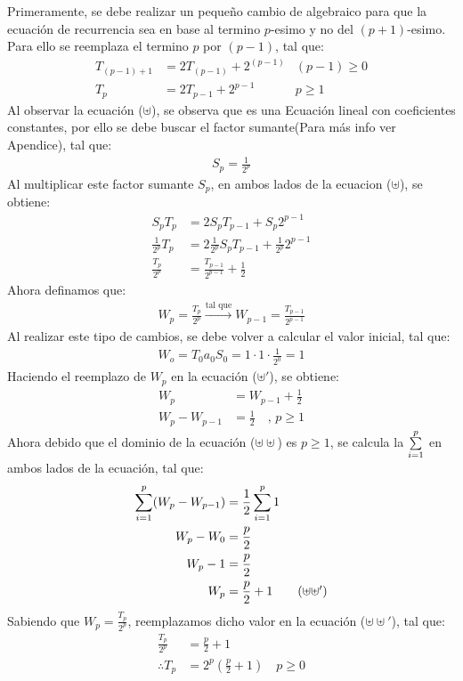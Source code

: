 Primeramente, se debe realizar un pequeño cambio de algebraico para que la ecuación de recurrencia sea en base al termino $p$-esimo y no del $(p+1)$-esimo.
Para ello se reemplaza el termino $p$ por $(p-1)$, tal que:
\begin{align*}
     T_{(p-1)+1} &= 2T_{(p-1)} +2^{(p-1)} & (p-1)\ge0 \\
     T_{p} &= 2T_{p-1} +2^{p-1} & p\ge1 \tag{$\uplus$}
\end{align*}
Al observar la ecuación ($\uplus$), se observa que es una Ecuación lineal con coeficientes constantes, por ello se debe buscar el factor sumante(Para más info ver Apendice), tal que:
\begin{align*}
    S_p = \frac{1}{2^p}
\end{align*}
Al multiplicar este factor sumante $S_p$, en ambos lados de la ecuacion ($\uplus$), se obtiene:
\begin{align*}
    S_p T_{p} &= 2S_pT_{p-1} +S_p2^{p-1} \\
    \frac{1}{2^p} T_{p} &= 2\frac{1}{2^p}S_pT_{p-1} +\frac{1}{2^p}2^{p-1} \\
    \frac{T_p}{2^p} &= \frac{T_{p-1}}{2^{p-1}} + \frac{1}{2} \tag{$\uplus'$}
\end{align*}
Ahora definamos que:
\begin{align*}
    W_p = \frac{T_p}{2^p} \xrightarrow{\text{tal que}} W_{p-1} = \frac{T_{p-1}}{2^{p-1}}
\end{align*}
Al realizar este tipo de cambios, se debe volver a calcular el valor inicial, tal que:
\begin{align*}
    W_o = T_0 a_0 S_0 = 1 \cdot 1 \cdot \frac{1}{2^0} = 1 
\end{align*}
Haciendo el reemplazo de $W_p$ en la ecuación ($\uplus '$), se obtiene:
\begin{align*}
    W_p &= W_{p-1} + \frac{1}{2} \\ 
    W_p - W_{p-1} &= \frac{1}{2} \quad \text{, } p \ge 1 \tag{$\uplus \uplus $}
\end{align*}
Ahora debido que el dominio de la ecuación ({$\uplus \uplus$}) es $p \ge 1$, se calcula la $\sum\limits_{i=1}^{p}$ en ambos lados de la ecuación, tal que:
\begin{align*}
\sum\limits_{i=1}^{p} (W_p -  W_{p-1}) &= \frac{1}{2}\sum\limits_{i=1}^{p}1 \\
W_p - W_0 &= \frac{p}{2} \\
W_p - 1 &= \frac{p}{2} \\
W_p &= \frac{p}{2} + 1 \tag{$\uplus\uplus'$} \\
\end{align*} 
Sabiendo que $W_p = \frac{T_p}{2^p}$, reemplazamos dicho valor en la ecuación ($\uplus\uplus'$), tal que:
\begin{align*}
    \frac{T_p}{2^p} &= \frac{p}{2} + 1\\
    \therefore T_p &= 2^p\left( \frac{p}{2} + 1 \right) \quad p \ge 0\\
\end{align*}